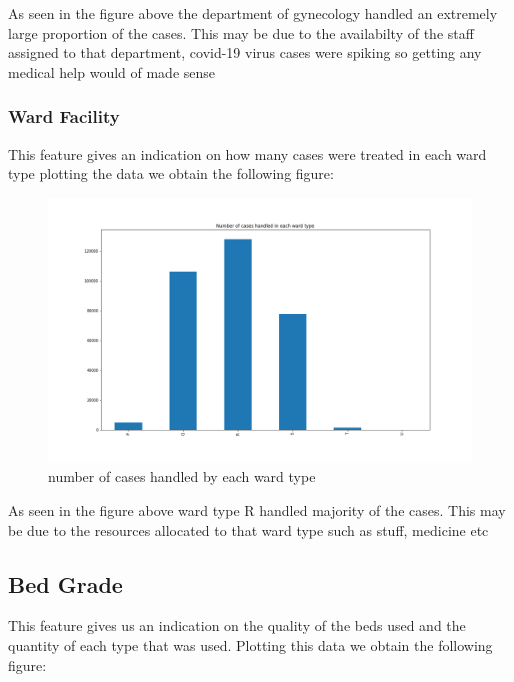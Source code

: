 \documentclass[fleqn]{article}
\begin{document}
			As seen in the figure above the department of gynecology handled an extremely large proportion of the cases. This may be due to the availabilty of the staff assigned to that department, covid-19 virus cases were spiking so getting any medical help would of made sense
			
		\newpage
		\subsubsection*{Ward Facility}
		 This feature gives an indication on how many cases were treated in each ward type plotting the data we obtain the following figure:
		 
		 \begin{figure}[hb]
  				\includegraphics[width=\linewidth]{ward_hist.png}
  				\caption{number of cases handled by each ward type}
  				\label{fig:9}
			\end{figure} 
			\FloatBarrier
			
		As seen in the figure above ward type R handled majority of the cases. This 			may be due to the resources allocated to that ward type such as stuff, 					medicine etc
		
		\newpage
		\subsection*{Bed Grade}
			This feature gives us an indication on the quality of the beds used and the quantity of each type that was used. Plotting this data we obtain the following figure:	
			
\end{document}
